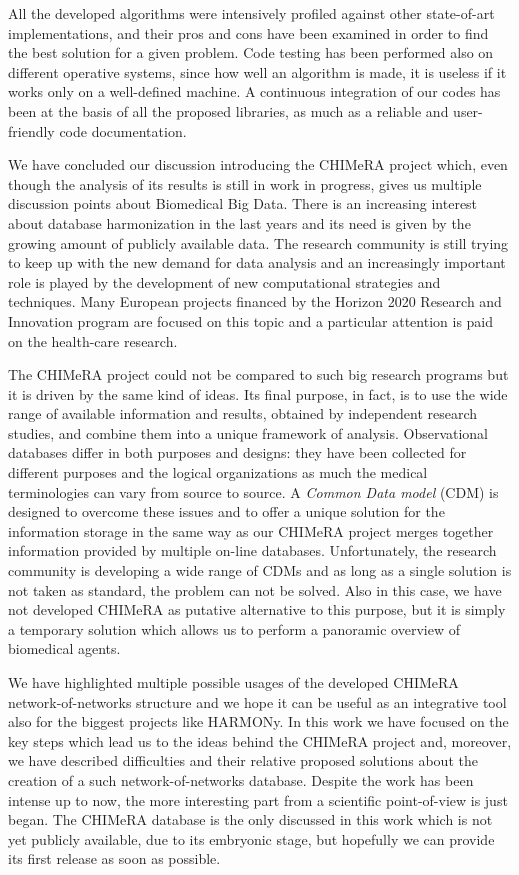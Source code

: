 \documentclass{standalone}
\begin{document}
All the developed algorithms were intensively profiled against other state-of-art implementations, and their pros and cons have been examined in order to find the best solution for a given problem.
Code testing has been performed also on different operative systems, since how well an algorithm is made, it is useless if it works only on a well-defined machine.
A continuous integration of our codes has been at the basis of all the proposed libraries, as much as a reliable and user-friendly code documentation.

We have concluded our discussion introducing the \textsf{CHIMeRA} project which, even though the analysis of its results is still in work in progress, gives us multiple discussion points about Biomedical Big Data.
There is an increasing interest about database harmonization in the last years and its need is given by the growing amount of publicly available data.
The research community is still trying to keep up with the new demand for data analysis and an increasingly important role is played by the development of new computational strategies and techniques.
Many European projects financed by the Horizon 2020 Research and Innovation program are focused on this topic and a particular attention is paid on the health-care research.

The \textsf{CHIMeRA} project could not be compared to such big research programs but it is driven by the same kind of ideas.
Its final purpose, in fact, is to use the wide range of available information and results, obtained by independent research studies, and combine them into a unique framework of analysis.
Observational databases differ in both purposes and designs: they have been collected for different purposes and the logical organizations as much the medical terminologies can vary from source to source.
A \emph{Common Data model} (CDM) is designed to overcome these issues and to offer a unique solution for the information storage in the same way as our \textsf{CHIMeRA} project merges together information provided by multiple on-line databases.
Unfortunately, the research community is developing a wide range of CDMs and as long as a single solution is not taken as standard, the problem can not be solved.
Also in this case, we have not developed \textsf{CHIMeRA} as putative alternative to this purpose, but it is simply a temporary solution which allows us to perform a panoramic overview of biomedical agents.

We have highlighted multiple possible usages of the developed \textsf{CHIMeRA} network-of-networks structure and we hope it can be useful as an integrative tool also for the biggest projects like HARMONy.
In this work we have focused on the key steps which lead us to the ideas behind the \textsf{CHIMeRA} project and, moreover, we have described difficulties and their relative proposed solutions about the creation of a such network-of-networks database.
Despite the work has been intense up to now, the more interesting part from a scientific point-of-view is just began.
The \textsf{CHIMeRA} database is the only  discussed in this work which is not yet publicly available, due to its embryonic stage, but hopefully we can provide its first release as soon as possible.
\end{document}
